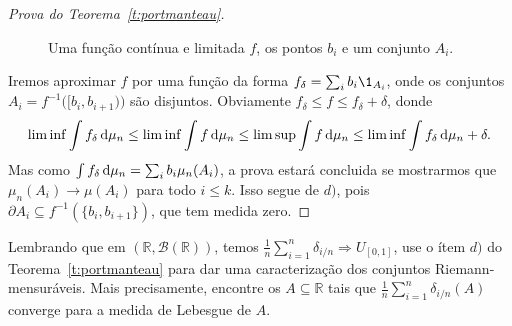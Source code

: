 \begin{topics}
\begin{proof}[Prova do Teorema~\ref{t:portmanteau}]
    \begin{figure}[!ht]
      \centering
      \caption{Uma função contínua e limitada $f$, os pontos $b_i$ e um conjunto $A_i$.}
    \end{figure}

    Iremos aproximar $f$ por uma função da forma $f_\delta = \sum_{i} b_i \1_{A_i}$, onde os conjuntos $A_i = f^{-1}\big( [b_i, b_{i+1}) \big)$ são disjuntos.
    Obviamente $f_\delta \leq f \leq f_\delta + \delta$, donde
    \begin{equation*}
      \liminf \int f_\delta \mathop{}\!\mathrm{d} \mu_n \leq \liminf \int f \mathop{}\!\mathrm{d} \mu_n \leq \limsup \int f \mathop{}\!\mathrm{d} \mu_n \leq \liminf \int f_\delta \mathop{}\!\mathrm{d} \mu_n + \delta.
    \end{equation*}
    Mas como $\int f_\delta \mathop{}\!\mathrm{d} \mu_n = \sum_i b_i \mu_n (A_i)$, a prova estará concluida se mostrarmos que $\mu_n (A_i) \to \mu(A_i)$ para todo $i \leq k$.
    Isso segue de $d)$, pois $\partial A_i \subseteq f^{-1}(\{b_i, b_{i+1}\})$, que tem medida zero.
  \end{proof}

  \begin{exercise}
    Lembrando que em $(\mathbb{R}, \mathcal{B}(\mathbb{R}))$, temos $\tfrac{1}{n} \sum_{i=1}^n \delta_{i/n} \Rightarrow U_{[0,1]}$, use o ítem $d)$ do Teorema~\ref{t:portmanteau} para dar uma caracterização dos conjuntos Riemann-mensuráveis.
    Mais precisamente, encontre os $A \subseteq \mathbb{R}$ tais que $\tfrac{1}{n} \sum_{i=1}^n \delta_{i/n}(A)$ converge para a medida de Lebesgue de $A$.
  \end{exercise}
\end{topics}


